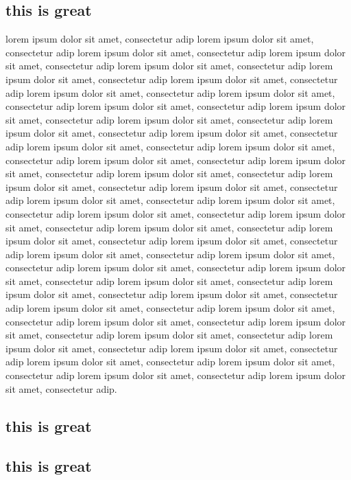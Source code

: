 \subsection{this is great}
lorem ipsum dolor sit amet, consectetur adip lorem ipsum dolor sit amet, consectetur adip lorem ipsum dolor sit amet, consectetur adip lorem ipsum dolor sit amet, consectetur adip lorem ipsum dolor sit amet, consectetur adip lorem ipsum dolor sit amet, consectetur adip lorem ipsum dolor sit amet, consectetur adip lorem ipsum dolor sit amet, consectetur adip lorem ipsum dolor sit amet, consectetur adip lorem ipsum dolor sit amet, consectetur adip lorem ipsum dolor sit amet, consectetur adip lorem ipsum dolor sit amet, consectetur adip lorem ipsum dolor sit amet, consectetur adip lorem ipsum dolor sit amet, consectetur adip lorem ipsum dolor sit amet, consectetur adip lorem ipsum dolor sit amet, consectetur adip lorem ipsum dolor sit amet, consectetur adip lorem ipsum dolor sit amet, consectetur adip lorem ipsum dolor sit amet, consectetur adip lorem ipsum dolor sit amet, consectetur adip lorem ipsum dolor sit amet, consectetur adip lorem ipsum dolor sit amet, consectetur adip lorem ipsum dolor sit amet, consectetur adip lorem ipsum dolor sit amet, consectetur adip lorem ipsum dolor sit amet, consectetur adip lorem ipsum dolor sit amet, consectetur adip lorem ipsum dolor sit amet, consectetur adip lorem ipsum dolor sit amet, consectetur adip lorem ipsum dolor sit amet, consectetur adip lorem ipsum dolor sit amet, consectetur adip lorem ipsum dolor sit amet, consectetur adip lorem ipsum dolor sit amet, consectetur adip lorem ipsum dolor sit amet, consectetur adip lorem ipsum dolor sit amet, consectetur adip lorem ipsum dolor sit amet, consectetur adip lorem ipsum dolor sit amet, consectetur adip lorem ipsum dolor sit amet, consectetur adip lorem ipsum dolor sit amet, consectetur adip lorem ipsum dolor sit amet, consectetur adip lorem ipsum dolor sit amet, consectetur adip lorem ipsum dolor sit amet, consectetur adip lorem ipsum dolor sit amet, consectetur adip lorem ipsum dolor sit amet, consectetur adip lorem ipsum dolor sit amet, consectetur adip lorem ipsum dolor sit amet, consectetur adip lorem ipsum dolor sit amet, consectetur adip.
\subsection{this is great}
\subsection{this is great}
